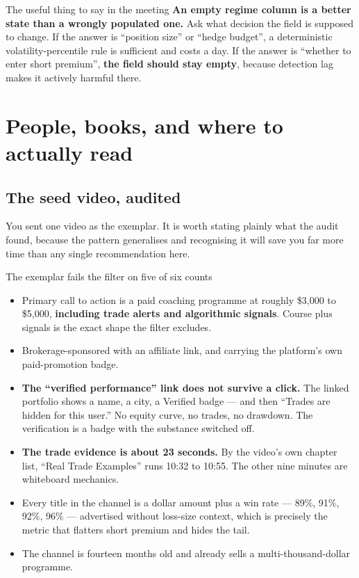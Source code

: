 \documentclass[11pt,a4paper]{article}
\begin{document}
\begin{keyfact}{The useful thing to say in the meeting}
\textbf{An empty regime column is a better state than a wrongly populated one.}
Ask what decision the field is supposed to change. If the answer is ``position
size'' or ``hedge budget'', a deterministic volatility-percentile rule is
sufficient and costs a day. If the answer is ``whether to enter short premium'',
\textbf{the field should stay empty}, because detection lag makes it actively
harmful there.
\end{keyfact}

\newpage
\section{People, books, and where to actually read}
\label{sec:people}

\subsection{The seed video, audited}

You sent one video as the exemplar. It is worth stating plainly what the audit
found, because the pattern generalises and recognising it will save you far more
time than any single recommendation here.

\begin{keyfact}{The exemplar fails the filter on five of six counts}
\begin{itemize}
\item Primary call to action is a paid coaching programme at roughly \$3{,}000 to
\$5{,}000, \textbf{including trade alerts and algorithmic signals}. Course plus
signals is the exact shape the filter excludes.
\item Brokerage-sponsored with an affiliate link, and carrying the platform's own
paid-promotion badge.
\item \textbf{The ``verified performance'' link does not survive a click.} The
linked portfolio shows a name, a city, a Verified badge --- and then ``Trades are
hidden for this user.'' No equity curve, no trades, no drawdown. The verification
is a badge with the substance switched off.
\item \textbf{The trade evidence is about 23 seconds.} By the video's own chapter
list, ``Real Trade Examples'' runs 10:32 to 10:55. The other nine minutes are
whiteboard mechanics.
\item Every title in the channel is a dollar amount plus a win rate --- 89\%,
91\%, 92\%, 96\% --- advertised without loss-size context, which is precisely the
metric that flatters short premium and hides the tail.
\item The channel is fourteen months old and already sells a multi-thousand-dollar
programme.
\end{itemize}
\end{keyfact}
\end{document}
